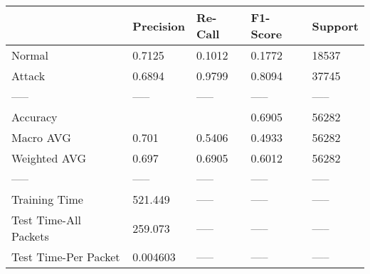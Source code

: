 \begin{tabular}{lllll}
\toprule
{} & Precision & Re-Call & F1-Score & Support \\
\midrule
Normal                &    0.7125 &  0.1012 &   0.1772 &   18537 \\
Attack                &    0.6894 &  0.9799 &   0.8094 &   37745 \\
-----                 &     ----- &   ----- &    ----- &   ----- \\
Accuracy              &           &         &   0.6905 &   56282 \\
Macro AVG             &     0.701 &  0.5406 &   0.4933 &   56282 \\
Weighted AVG          &     0.697 &  0.6905 &   0.6012 &   56282 \\
-----                 &     ----- &   ----- &    ----- &   ----- \\
Training Time         &   521.449 &   ----- &    ----- &   ----- \\
Test Time-All Packets &   259.073 &   ----- &    ----- &   ----- \\
Test Time-Per Packet  &  0.004603 &   ----- &    ----- &   ----- \\
\bottomrule
\end{tabular}
